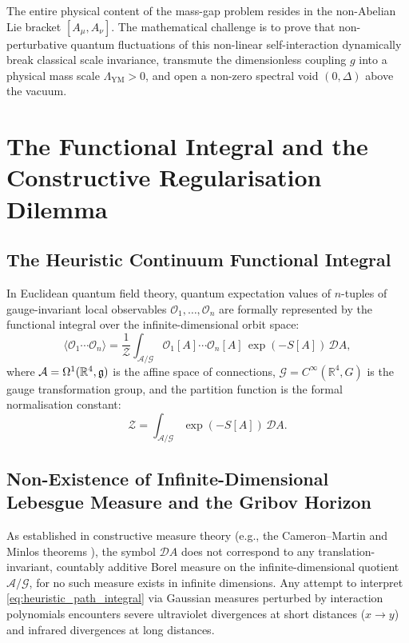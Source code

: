 \begin{conclusion}
The entire physical content of the mass-gap problem resides in the non-Abelian Lie bracket $[A_\mu, A_\nu]$. The mathematical challenge is to prove that non-perturbative quantum fluctuations of this non-linear self-interaction dynamically break classical scale invariance, transmute the dimensionless coupling $g$ into a physical mass scale $\Lambda_{\mathrm{YM}} > 0$, and open a non-zero spectral void $(0, \Delta)$ above the vacuum.
\end{conclusion}


\section{The Functional Integral and the Constructive Regularisation Dilemma}
\label{sec:functional_integral}

\subsection{The Heuristic Continuum Functional Integral}
\label{subsec:heuristic_integral}
In Euclidean quantum field theory, quantum expectation values of $n$-tuples of gauge-invariant local observables $\mathcal{O}_1, \dots, \mathcal{O}_n$ are formally represented by the functional integral over the infinite-dimensional orbit space:
\begin{equation}
\label{eq:heuristic_path_integral}
\langle \mathcal{O}_1 \cdots \mathcal{O}_n \rangle = \frac{1}{\mathcal{Z}} \int_{\mathcal{A}/\mathcal{G}} \mathcal{O}_1[A] \cdots \mathcal{O}_n[A] \, \exp(-S[A]) \, \mathcal{D}A,
\end{equation}
where $\mathcal{A} = \Omega^1(\mathbb{R}^4, \mathfrak{g})$ is the affine space of connections, $\mathcal{G} = C^\infty(\mathbb{R}^4, G)$ is the gauge transformation group, and the partition function is the formal normalisation constant:
\begin{equation}
\mathcal{Z} = \int_{\mathcal{A}/\mathcal{G}} \exp(-S[A]) \, \mathcal{D}A.
\end{equation}

\subsection{Non-Existence of Infinite-Dimensional Lebesgue Measure and the Gribov Horizon}
\label{subsec:measure_and_gribov}
As established in constructive measure theory (e.g., the Cameron--Martin and Minlos theorems \cite{GlimmJaffe1987}), the symbol $\mathcal{D}A$ does not correspond to any translation-invariant, countably additive Borel measure on the infinite-dimensional quotient $\mathcal{A}/\mathcal{G}$, for no such measure exists in infinite dimensions. Any attempt to interpret \eqref{eq:heuristic_path_integral} via Gaussian measures perturbed by interaction polynomials encounters severe ultraviolet divergences at short distances ($x \to y$) and infrared divergences at long distances.

